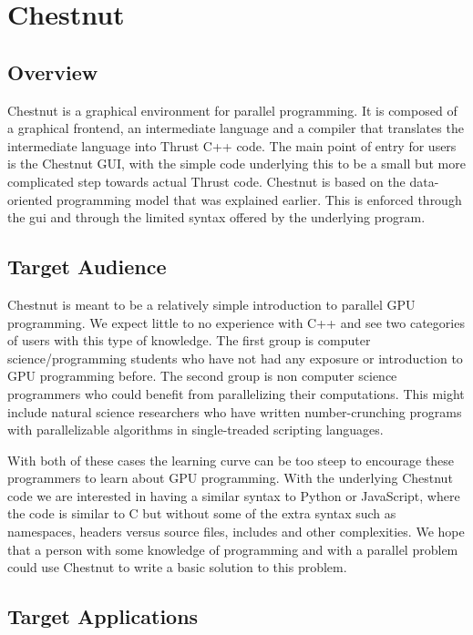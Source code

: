 \documentclass[twocolumn]{article}
\renewcommand{\|}{\origbar} %
\begin{document}
\section{Chestnut}
\label{sec:chestnut}

\subsection{Overview}

Chestnut is a graphical environment for parallel programming. It is composed of a graphical frontend, an intermediate language and a compiler that translates the intermediate language into Thrust C++ code. The main point of entry for users is the Chestnut GUI, with the simple code underlying this to be a small but more complicated step towards actual Thrust code. Chestnut is based on the data-oriented programming model that was explained earlier. This is enforced through the gui and through the limited syntax offered by the underlying program.

\subsection{Target Audience}

Chestnut is meant to be a relatively simple introduction to parallel GPU programming. We expect little to no experience with C++ and see two categories of users with this type of knowledge. The first group is computer science/programming students who have not had any exposure or introduction to GPU programming before. The second group is non computer science programmers who could benefit from parallelizing their computations. This might include natural science researchers who have written number-crunching programs with parallelizable algorithms in single-treaded scripting languages.

With both of these cases the learning curve can be too steep to encourage these programmers to learn about GPU programming. With the underlying Chestnut code we are interested in having a similar syntax to Python or JavaScript, where the code is similar to C but without some of the extra syntax such as namespaces, headers versus source files, includes and other complexities. We hope that a person with some knowledge of programming and with a parallel problem could use Chestnut to write a basic solution to this problem.

\subsection{Target Applications}
\end{document}
